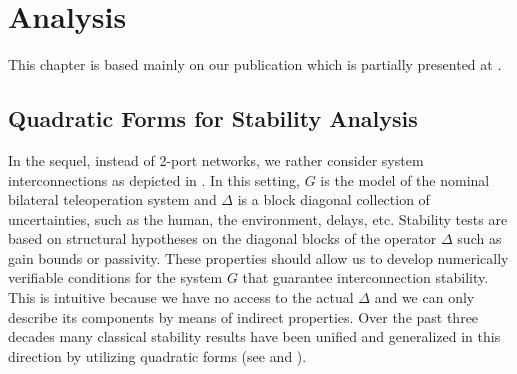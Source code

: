\chapter{Analysis}
\label{chap:analysis}

This chapter is based mainly on our publication \cite{polattro} which is partially presented at 
\cite{polatACC11,polatIFAC11,polatWH11}. 


\section{Quadratic Forms for Stability Analysis}
In the sequel, instead of 2-port networks, we rather consider system interconnections as 
depicted in . In this setting, $G$ is the model of the nominal bilateral 
teleoperation system and $\Delta$ is a block diagonal collection of uncertainties, such as 
the human, the environment, delays, etc. Stability tests are based on structural hypotheses 
on the diagonal blocks of the operator $\Delta$ such as gain bounds or passivity. These 
properties should allow us to develop numerically verifiable conditions for the system $G$ that 
guarantee interconnection stability. This is intuitive because we have no access to the actual 
$\Delta$ and we can only describe its components by means of indirect properties. Over the 
past three decades many classical stability results have been unified and generalized in 
this direction by utilizing quadratic forms (see \cite{megretski} and \cite{safonov,carsten2,iwasaki}).


